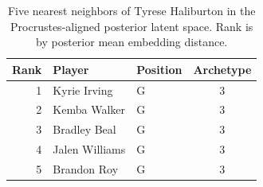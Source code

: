 \begin{table}[htbp]
  \centering\small
  \begin{tabular}{rllc}
    \toprule
    Rank & Player & Position & Archetype \\
    \midrule
    1 & Kyrie Irving & G & 3 \\
    2 & Kemba Walker & G & 3 \\
    3 & Bradley Beal & G & 3 \\
    4 & Jalen Williams & G & 3 \\
    5 & Brandon Roy & G & 3 \\
    \bottomrule
  \end{tabular}
  \caption{Five nearest neighbors of Tyrese Haliburton in the Procrustes-aligned posterior latent space. Rank is by posterior mean embedding distance.}
  \label{tab:Tyrese_Haliburton_neighbors}
\end{table}

